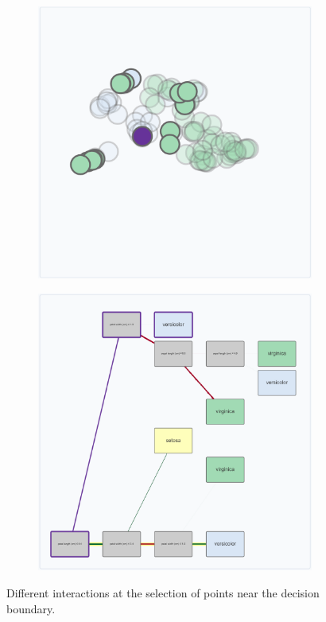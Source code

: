 \begin{figure}[htbp]
    \begin{subfigure}[c]{0.325\textwidth}
        \includegraphics[width=\linewidth]{images/teacherVariousInteractionsBlocksScatter4.png}
    \end{subfigure}
    \begin{subfigure}[c]{0.325\textwidth}
        \includegraphics[width=\linewidth]{images/teacherVariousInteractionsBlocks4.png}
    \end{subfigure}

    \caption{Different interactions at the selection of points near the decision boundary.}
    \label{fig:teacherVariousInteractionsBlocks}
\end{figure}


